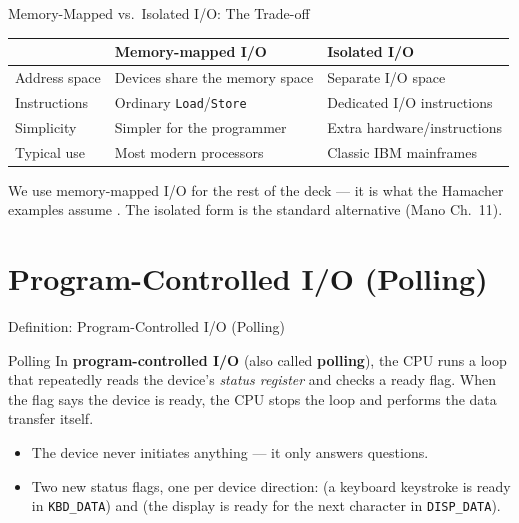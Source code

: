 \documentclass[aspectratio=169]{beamer}
\begin{document}
\begin{frame}{Memory-Mapped vs.\ Isolated I/O: The Trade-off}
  \footnotesize
  \begin{tabular}{@{}lll@{}}
    \toprule
    & \textbf{Memory-mapped I/O} & \textbf{Isolated I/O} \\
    \midrule
    Address space & Devices share the memory space & Separate I/O space \\
    Instructions & Ordinary \texttt{Load}/\texttt{Store} & Dedicated I/O instructions \\
    Simplicity & Simpler for the programmer & Extra hardware/instructions \\
    Typical use & Most modern processors & Classic IBM mainframes \\
    \bottomrule
  \end{tabular}
  \vspace{0.3cm}
  \normalsize
  We use memory-mapped I/O for the rest of the deck --- it is what the
  Hamacher examples assume \cite{Hamacher2002_computer_organization}. The
  isolated form is the standard alternative (Mano Ch.~11).
\end{frame}


\section{Program-Controlled I/O (Polling)}

\begin{frame}{Definition: Program-Controlled I/O (Polling)}
  \begin{block}{Polling}
    In \textbf{program-controlled I/O} (also called \textbf{polling}), the
    CPU runs a loop that repeatedly reads the device's \emph{status register}
    and checks a ready flag. When the flag says the device is ready, the CPU
    stops the loop and performs the data transfer itself.
  \end{block}
  \begin{itemize}
    \item The device never initiates anything --- it only answers questions.
    \item Two new status flags, one per device direction:
       (a keyboard keystroke is ready in
      \texttt{KBD\_DATA}) and  (the display is ready for
      the next character in \texttt{DISP\_DATA}).
  \end{itemize}
\end{frame}
\end{document}
